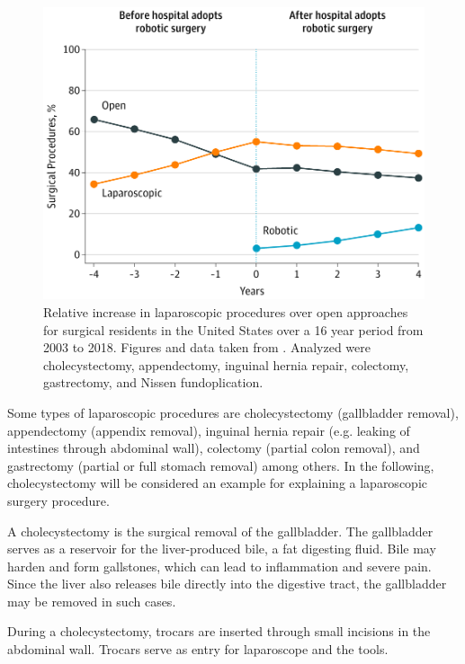\begin{figure}
    \centering
    \includegraphics[width=\textwidth]{introduction/img/robotic_since_introduction.png}
    \caption{Relative increase in laparoscopic procedures over open approaches for surgical residents in the United States over a 16 year period from 2003 to 2018. Figures and data taken from \cite{sheetz2020trends}. Analyzed were cholecystectomy, appendectomy, inguinal hernia repair, colectomy, gastrectomy, and Nissen fundoplication.}
    \label{in:fig:robotic_vs_laparoscopic_vs_open}
\end{figure}
Some types of laparoscopic procedures are cholecystectomy (gallbladder removal), appendectomy (appendix removal), inguinal hernia repair (e.g. leaking of intestines through abdominal wall), colectomy (partial colon removal), and gastrectomy (partial or full stomach removal) among others. In the following, cholecystectomy will be considered an example for explaining a laparoscopic surgery procedure. 

A cholecystectomy is the surgical removal of the gallbladder. The gallbladder serves as a reservoir for the liver-produced bile, a fat digesting fluid. Bile may harden and form gallstones, which can lead to inflammation and severe pain. Since the liver also releases bile directly into the digestive tract, the gallbladder may be removed in such cases. 

During a cholecystectomy, trocars are inserted through small incisions in the abdominal wall. Trocars serve as entry for laparoscope and the tools. 


